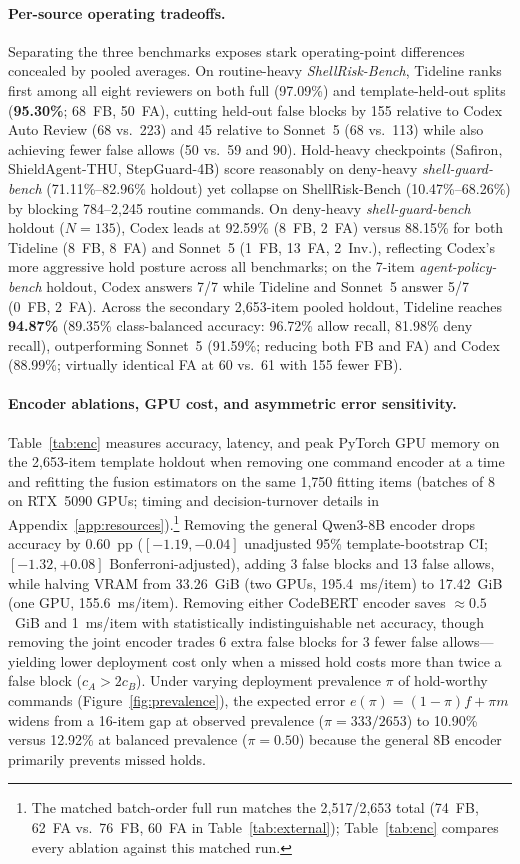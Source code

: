 \documentclass[sigconf,anonymous,nonacm]{acmart}
\begin{document}
\paragraph{Per-source operating tradeoffs.}
Separating the three benchmarks exposes stark operating-point differences concealed by pooled averages. On routine-heavy \textit{ShellRisk-Bench}, Tideline ranks first among all eight reviewers on both full (97.09\%) and template-held-out splits (\textbf{95.30\%}; 68~FB, 50~FA), cutting held-out false blocks by 155 relative to Codex Auto Review (68 vs.\ 223) and 45 relative to Sonnet~5 (68 vs.\ 113) while also achieving fewer false allows (50 vs.\ 59 and 90). Hold-heavy checkpoints (Safiron, ShieldAgent-THU, StepGuard-4B) score reasonably on deny-heavy \textit{shell-guard-bench} (71.11\%--82.96\% holdout) yet collapse on ShellRisk-Bench (10.47\%--68.26\%) by blocking 784--2,245 routine commands. On deny-heavy \textit{shell-guard-bench} holdout ($N=135$), Codex leads at 92.59\% (8~FB, 2~FA) versus 88.15\% for both Tideline (8~FB, 8~FA) and Sonnet~5 (1~FB, 13~FA, 2~Inv.), reflecting Codex's more aggressive hold posture across all benchmarks; on the 7-item \textit{agent-policy-bench} holdout, Codex answers 7/7 while Tideline and Sonnet~5 answer 5/7 (0~FB, 2~FA). Across the secondary 2,653-item pooled holdout, Tideline reaches \textbf{94.87\%} (89.35\% class-balanced accuracy: 96.72\% allow recall, 81.98\% deny recall), outperforming Sonnet~5 (91.59\%; reducing both FB and FA) and Codex (88.99\%; virtually identical FA at 60 vs.\ 61 with 155 fewer FB).

\paragraph{Encoder ablations, GPU cost, and asymmetric error sensitivity.}
Table~\ref{tab:enc} measures accuracy, latency, and peak PyTorch GPU memory on the 2,653-item template holdout when removing one command encoder at a time and refitting the fusion estimators on the same 1,750 fitting items (batches of 8 on RTX~5090 GPUs; timing and decision-turnover details in Appendix~\ref{app:resources}).\footnote{The matched batch-order full run matches the 2,517/2,653 total (74~FB, 62~FA vs.\ 76~FB, 60~FA in Table~\ref{tab:external}); Table~\ref{tab:enc} compares every ablation against this matched run.} Removing the general Qwen3-8B encoder drops accuracy by $0.60$~pp ($[-1.19, -0.04]$ unadjusted 95\% template-bootstrap CI; $[-1.32, +0.08]$ Bonferroni-adjusted), adding 3 false blocks and 13 false allows, while halving VRAM from 33.26~GiB (two GPUs, 195.4~ms/item) to 17.42~GiB (one GPU, 155.6~ms/item). Removing either CodeBERT encoder saves $\approx 0.5$~GiB and 1~ms/item with statistically indistinguishable net accuracy, though removing the joint encoder trades 6 extra false blocks for 3 fewer false allows---yielding lower deployment cost only when a missed hold costs more than twice a false block ($c_A > 2 c_B$). Under varying deployment prevalence $\pi$ of hold-worthy commands (Figure~\ref{fig:prevalence}), the expected error $e(\pi)=(1-\pi)f+\pi m$ widens from a 16-item gap at observed prevalence ($\pi=333/2653$) to 10.90\% versus 12.92\% at balanced prevalence ($\pi=0.50$) because the general 8B encoder primarily prevents missed holds.
\end{document}

